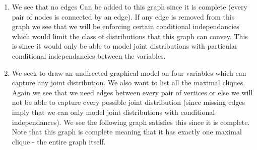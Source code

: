 \documentclass[]{article}
\begin{document}

\begin{enumerate}
\def\labelenumi{\arabic{enumi}.}
\setcounter{enumi}{1}
\item
  We see that no edges Can be added to this graph since it is complete
  (every pair of nodes is connected by an edge). If any edge is removed
  from this graph we see that we will be enforcing certain conditional
  independancies which would limit the class of distributions that this
  graph can convey. This is since it would only be able to model joint
  distributions with particular conditional independancies between the
  variables.
\item
  We seek to draw an undirected graphical model on four variables which
  can capture any joint distribution. We also want to list all the
  maximal cliques. Again we see that we need edges between every pair of
  vertices or else we will not be able to capture every possible joint
  distribution (since missing edges imply that we can only model joint
  distributions with conditional independances). We see the following
  graph satisfies this since it is complete. Note that this graph is
  complete meaning that it has exactly one maximal clique - the entire
  graph itself.
\end{enumerate}
\end{document}
